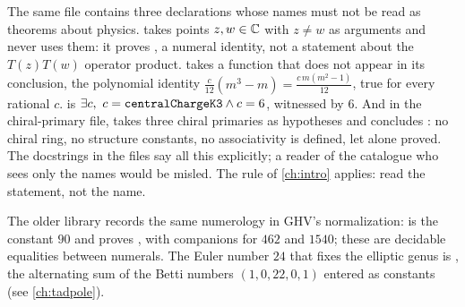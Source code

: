 \begin{pitfallbox}
The same file contains three declarations whose names must not be read as theorems about
physics.  takes points $z,w\in\mathbb{C}$ with $z\ne w$ as
arguments and never uses them: it proves , a numeral identity,
not a statement about the $T(z)T(w)$ operator product.
 takes a function  that does not appear
in its conclusion, the polynomial identity $\tfrac c{12}(m^3-m)=\tfrac{c\,m(m^2-1)}{12}$, true
for every rational $c$.  is
$\exists c,\ c=\texttt{centralChargeK3}\wedge c=6$, witnessed by $6$. And in the chiral-primary
file,  takes three chiral primaries as hypotheses
and concludes : no chiral ring, no structure constants, no associativity is
defined, let alone proved. The docstrings in the files say all this explicitly; a reader of
the catalogue who sees only the names would be misled. The rule of \cref{ch:intro} applies:
read the statement, not the name.
\end{pitfallbox}

\begin{leanbox}
The older  library records the same numerology in GHV's
normalization:  is the constant $90$ and
 proves , with companions for $462$ and
$1540$; these are decidable equalities between numerals. The Euler number $24$ that fixes
the elliptic genus is , the alternating sum of
the Betti numbers $(1,0,22,0,1)$ entered as constants (see \cref{ch:tadpole}).
\end{leanbox}

